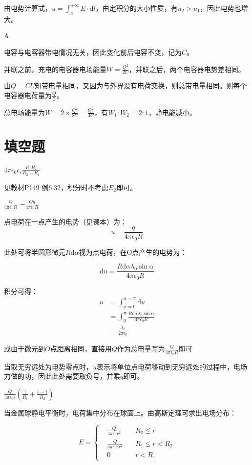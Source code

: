 \documentclass[b5paper,opensource,sourcefont,parskip]{qyxf-book}
\newcommand{\di}[1]{\mathrm{d}#1}
\begin{document}
由电势计算式，$ u=\int_a^{+\infty} E\cdot\di{l} $，由定积分的大小性质，有$ u_2>u_1 $，因此电势也增大。

A

\solve 电容与电容器带电情况无关，因此变化前后电容不变，记为$ C $。

并联之前，充电的电容器电场能量$ W=\frac{Q^2}{2C} $，并联之后，两个电容器电势差相同。

由$ Q=CU $知带电量相同，又因为与外界没有电荷交换，则总带电量相同。则每个电容器电荷量为$ \frac{Q}{2} $。

总电场能量为$ W=2\times \frac{Q^2}{8C}=\frac{Q^2}{4C} $，有$ W_1:W_2=2:1 $，静电能减小。

\section{填空题}
 $4\pi\epsilon_0\epsilon_r\frac{R_1R_2}{R_2-R_1}$

\solve 见教材P149 例6.32，积分时不考虑$E_2$即可。

 $\frac{Q}{4\pi\epsilon_0 R}$ \quad $-\frac{Qq}{4\pi\epsilon_0 R}$

\solve 点电荷在一点产生的电势（见课本）为：
\[u=\frac{q}{4\pi\epsilon_0 R}\]

此处可将半圆形微元$R\di{\alpha}$视为点电荷，在O点产生的电势为：

\[\di{u}=\frac{R\di{\alpha}\lambda_0\sin\alpha}{4\pi\epsilon_0 R}\]

积分可得：
\begin{align*}
u&=\int_{\alpha=0}^{\alpha=\pi} \di{u}\\
&=\int_0^{\pi} \frac{R\di{\alpha}\lambda_0\sin\alpha}{4\pi\epsilon_0 R}\\
&=\frac{\lambda_0}{2\pi\epsilon_0}
\end{align*}

或由于微元到$O$点距离相同，直接用$Q$作为总电量写为$\frac{Q}{4\pi\epsilon_0 R}$即可

当取无穷远处为电势零点时，$ u $表示将单位点电荷移动到无穷远处的过程中，电场力做的功，因此此处需要取负号，并乘$q$即可。

 $\frac{Q}{4\pi\epsilon_0\epsilon}\left(\frac{1}{R_1}+\frac{\epsilon-1}{R_2}\right)$

\solve 当金属球静电平衡时，电荷集中分布在球面上。由高斯定理可求出电场分布：

\begin{equation}
E=\left\{
\begin{aligned}
&\frac{Q}{4\pi\epsilon_0 r^2}\quad &R_2\leqslant r\\
&\frac{Q}{4\pi\epsilon_0\epsilon r^2}\quad &R_1\leqslant r<R_2\\
&0	&r<R_1
\end{aligned}
\right.
\end{equation}
\end{document}
